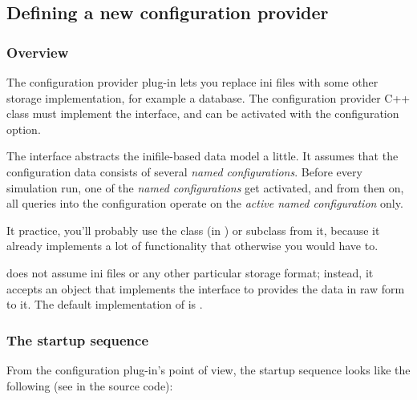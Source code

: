 \subsection{Defining a new configuration provider}
\label{sec:plugin-exts:configuration}

\subsubsection{Overview}

The configuration provider plug-in lets you replace ini files
with some other storage implementation, for example a database.
The configuration provider C++ class must implement the
 interface, and can be activated with
the  configuration option.

The  interface abstracts the inifile-based
data model a little. It assumes that the configuration data
consists of several \textit{named configurations}. Before every
simulation run, one of the \textit{named configurations} get
activated, and from then on, all queries into the configuration
operate on the \textit{active named configuration} only.

It practice, you'll probably use the 
class (in ) or subclass from it, because it already
implements a lot of functionality that otherwise you would have to.

 does not assume ini files or
any other particular storage format; instead, it accepts
an object that implements the 
interface to provides the data in raw form to it.
The default implementation of  is
.

\subsubsection{The startup sequence}

From the configuration plug-in's point of view, the startup sequence
looks like the following (see  in the source code):


